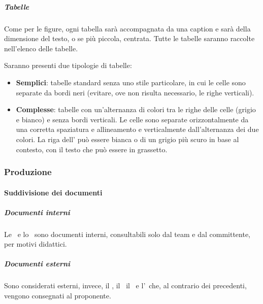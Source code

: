 			\subparagraph{Tabelle}\label{StrumentiDiSupportoTabelle}
			Come per le figure, ogni tabella sarà accompagnata da una caption e sarà della dimensione del testo, o se più piccola, centrata.
			Tutte le tabelle saranno raccolte nell'elenco delle tabelle.\par
			Saranno presenti due tipologie di tabelle:
			\begin{itemize}
				\item \textbf{Semplici}: tabelle standard senza uno stile particolare, in cui le celle sono separate da bordi neri (evitare, ove non risulta necessario,
					le righe verticali).
				\item \textbf{Complesse}: tabelle con un'alternanza di colori tra le righe delle celle (grigio e bianco) e senza bordi verticali.
					Le celle sono separate orizzontalmente da una corretta spaziatura e allineamento e verticalmente dall'alternanza dei due colori.
					La riga dell' può essere bianca o di un grigio più scuro in base al contesto, con il testo che può essere in grassetto.
			\end{itemize}


		\subsubsection{Produzione}

			\paragraph{Suddivisione dei documenti}\label{SuddivisioneDeiDocumenti}

			\subparagraph{Documenti interni}
			Le \NdP\ e lo \SdF\ sono documenti interni, consultabili solo dal team e dal committente, per motivi didattici.

			\subparagraph{Documenti esterni}
			Sono considerati esterni, invece, il \PdP, il \PdQ\, il \Gl\ e l'\AdR\ che, al contrario dei precedenti, vengono consegnati al proponente.



